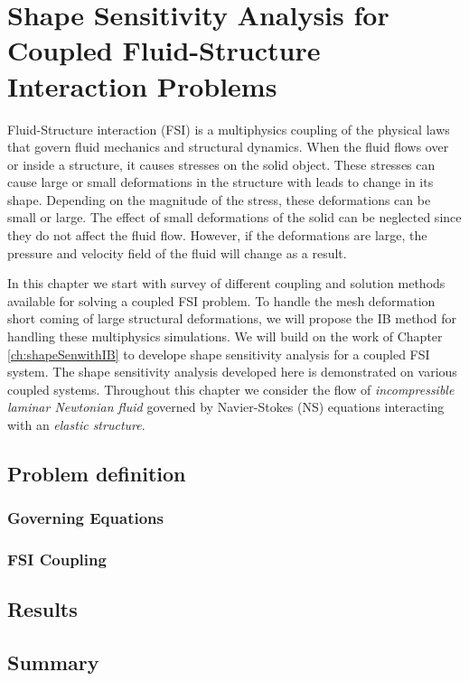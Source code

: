 \chapter{Shape Sensitivity Analysis for Coupled Fluid-Structure Interaction Problems}\label{ch:FSIsen}
Fluid-Structure interaction (FSI) is a multiphysics coupling of the physical laws that govern fluid mechanics and structural dynamics. When the fluid flows over or inside a structure, it causes stresses on the solid object. These stresses can cause large or small deformations in the structure with leads to change in its shape. Depending on the magnitude of the stress, these deformations can be small or large. The effect of small deformations of the solid can be neglected since they do not affect the fluid flow. However, if the deformations are large, the pressure and velocity field of the fluid will change as a result.

In this chapter we start with survey of different coupling and solution methods available for solving a coupled FSI problem. To handle the mesh deformation short coming of large structural deformations, we will propose the IB method for handling these multiphysics simulations. We will build on the work of Chapter \ref{ch:shapeSenwithIB} to develope shape sensitivity analysis for a coupled FSI system. The shape sensitivity analysis developed here is demonstrated on various coupled systems. Throughout this chapter we consider the flow of \emph{incompressible laminar Newtonian fluid} governed by Navier-Stokes (NS) equations interacting with an \emph{elastic structure}. 


\section{Problem definition}
\subsection{Governing Equations}
\subsection{FSI Coupling}
\section{Results}
\section{Summary}